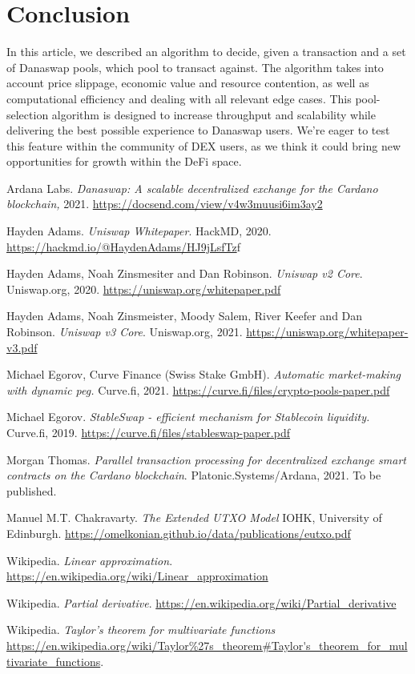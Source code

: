 \documentclass[12pt]{article}
\begin{document}
\section{Conclusion}

In this article, we described an algorithm to decide, given a transaction and a
set of Danaswap pools, which pool to transact against.
The algorithm takes into account price slippage, economic value and resource
contention, as well as computational efficiency and dealing with all relevant
edge cases. This pool-selection algorithm is designed to increase throughput and scalability while delivering the best possible experience to Danaswap users. We're eager to test this feature within the community of DEX users, as we think it could bring new opportunities for growth within the DeFi space.


\begin{thebibliography}{9}

 Ardana Labs. \textit{Danaswap: A scalable decentralized
  exchange for the Cardano blockchain,} 2021.
    \url{https://docsend.com/view/v4w3muusi6im3ay2}

 Hayden Adams. \textit{Uniswap Whitepaper}. HackMD, 2020.
  \url{https://hackmd.io/@HaydenAdams/HJ9jLsfTz}f

 Hayden Adams, Noah Zinsmesiter and Dan Robinson.
  \textit{Uniswap v2 Core}. Uniswap.org, 2020.
    \url{https://uniswap.org/whitepaper.pdf}

 Hayden Adams, Noah Zinsmeister, Moody Salem, River Keefer and
  Dan Robinson. \textit{Uniswap v3 Core}. Uniswap.org, 2021.
    \url{https://uniswap.org/whitepaper-v3.pdf}

 Michael Egorov, Curve Finance (Swiss Stake GmbH).
  \textit{Automatic market-making with dynamic peg.} Curve.fi, 2021.
    \url{https://curve.fi/files/crypto-pools-paper.pdf}

 Michael Egorov. \textit{StableSwap - efficient mechanism
  for Stablecoin liquidity.} Curve.fi, 2019.
    \url{https://curve.fi/files/stableswap-paper.pdf}

 Morgan Thomas. \textit{Parallel transaction processing for
  decentralized exchange smart contracts on the Cardano blockchain}. Platonic.Systems/Ardana, 2021. To be published.

 Manuel M.T. Chakravarty. \textit{The Extended UTXO Model} IOHK,
  University of Edinburgh.
    \url{https://omelkonian.github.io/data/publications/eutxo.pdf}

 Wikipedia. \textit{Linear approximation}.
  \url{https://en.wikipedia.org/wiki/Linear_approximation}

 Wikipedia. \textit{Partial derivative}.
  \url{https://en.wikipedia.org/wiki/Partial_derivative}

 Wikipedia. \textit{Taylor's theorem for
  multivariate functions}
    \url{https://en.wikipedia.org/wiki/Taylor%27s_theorem#Taylor's_theorem_for_multivariate_functions}.

\end{thebibliography}
\end{document}
